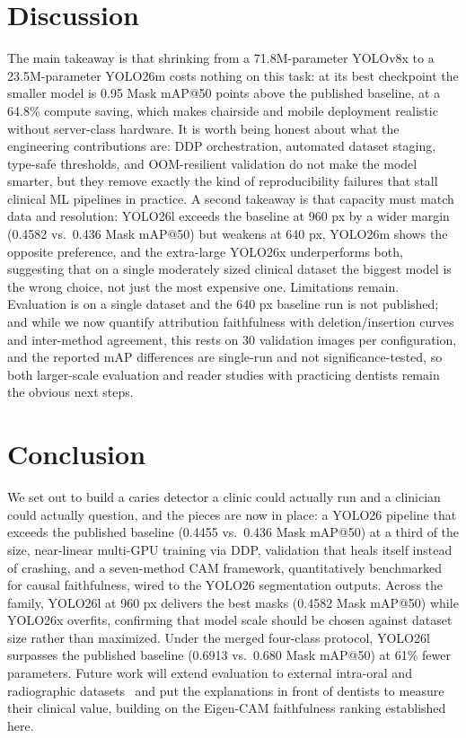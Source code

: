 \documentclass[conference]{IEEEtran}
\begin{document}
\section{Discussion}
The main takeaway is that shrinking from a 71.8M-parameter YOLOv8x to a 23.5M-parameter YOLO26m costs nothing on this task: at its best checkpoint the smaller model is 0.95 Mask mAP@50 points above the published baseline, at a 64.8\% compute saving, which makes chairside and mobile deployment realistic without server-class hardware. It is worth being honest about what the engineering contributions are: DDP orchestration, automated dataset staging, type-safe thresholds, and OOM-resilient validation do not make the model smarter, but they remove exactly the kind of reproducibility failures that stall clinical ML pipelines in practice. A second takeaway is that capacity must match data and resolution: YOLO26l exceeds the baseline at 960 px by a wider margin (0.4582 vs.\ 0.436 Mask mAP@50) but weakens at 640 px, YOLO26m shows the opposite preference, and the extra-large YOLO26x underperforms both, suggesting that on a single moderately sized clinical dataset the biggest model is the wrong choice, not just the most expensive one. Limitations remain. Evaluation is on a single dataset and the 640 px baseline run is not published; and while we now quantify attribution faithfulness with deletion/insertion curves and inter-method agreement, this rests on 30 validation images per configuration, and the reported mAP differences are single-run and not significance-tested, so both larger-scale evaluation and reader studies with practicing dentists remain the obvious next steps.

\section{Conclusion}
We set out to build a caries detector a clinic could actually run and a clinician could actually question, and the pieces are now in place: a YOLO26 pipeline that exceeds the published baseline (0.4455 vs.\ 0.436 Mask mAP@50) at a third of the size, near-linear multi-GPU training via DDP, validation that heals itself instead of crashing, and a seven-method CAM framework, quantitatively benchmarked for causal faithfulness, wired to the YOLO26 segmentation outputs. Across the family, YOLO26l at 960 px delivers the best masks (0.4582 Mask mAP@50) while YOLO26x overfits, confirming that model scale should be chosen against dataset size rather than maximized. Under the merged four-class protocol, YOLO26l surpasses the published baseline (0.6913 vs.\ 0.680 Mask mAP@50) at 61\% fewer parameters. Future work will extend evaluation to external intra-oral and radiographic datasets~\cite{uribe2024public} and put the explanations in front of dentists to measure their clinical value, building on the Eigen-CAM faithfulness ranking established here.



\end{document}
